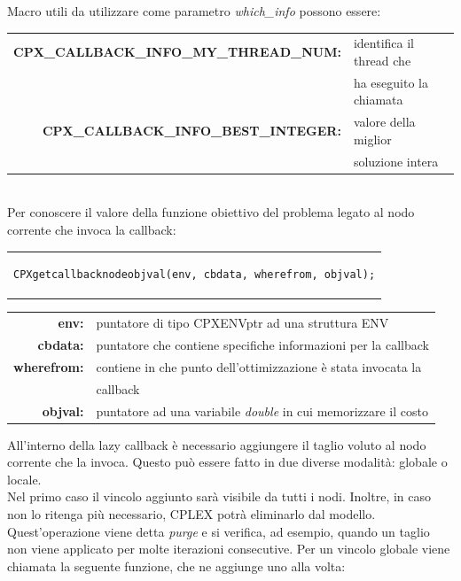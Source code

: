 Macro utili da utilizzare come parametro \textit{which\_info} possono essere:
\begin{table}[h]
\centering \footnotesize
\begin{tabular}{|r|l|}
\hline
\textbf{CPX\_CALLBACK\_INFO\_MY\_THREAD\_NUM:} & {identifica il thread che }\\
&{ha eseguito la chiamata}\\
\hline
\textbf{CPX\_CALLBACK\_INFO\_BEST\_INTEGER:} & {valore della miglior}\\
&{soluzione intera}\\
\hline
\end{tabular}
\end{table}
\\Per conoscere il valore della funzione obiettivo del problema legato al nodo corrente che invoca la callback:
\begin{center}
\begin{tabular}{c}
\begin{lstlisting}[linewidth=340pt, basicstyle=\footnotesize\sffamily,]  
CPXgetcallbacknodeobjval(env, cbdata, wherefrom, objval);
\end{lstlisting}
\end{tabular}
\end{center}
\begin{table}[h]
\centering
\begin{tabular}{rl}
\textbf{env:} & {puntatore di tipo CPXENVptr ad una struttura ENV}\\
\textbf{cbdata:} & {puntatore che contiene specifiche informazioni per la callback}\\
\textbf{wherefrom:} & {contiene in che punto dell'ottimizzazione è stata invocata la} \\ 
&{callback}\\
\textbf{objval:} & {puntatore ad una variabile \textit{double} in cui memorizzare il costo} \\
\end{tabular}
\end{table}
All'interno della lazy callback è necessario aggiungere il taglio voluto al nodo corrente che la invoca. Questo può essere fatto in due diverse modalità: globale o locale.\\
Nel primo caso il vincolo aggiunto sarà visibile da tutti i nodi. Inoltre, in caso non lo ritenga più necessario, CPLEX potrà eliminarlo dal modello. Quest'operazione viene detta \textit{purge} e si verifica, ad esempio, quando un taglio non viene applicato per molte iterazioni consecutive. Per un vincolo globale viene chiamata la seguente funzione, che ne aggiunge uno alla volta:
